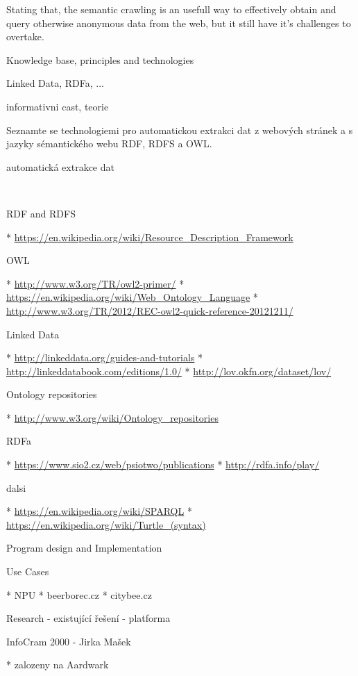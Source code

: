 Stating that, the semantic crawling is an usefull way to effectively obtain and
query otherwise anonymous data from the web, but it still have it's challenges
to overtake. 


\chap Knowledge base, principles and technologies

 Linked Data, RDFa, ...

informativni cast, teorie

Seznamte se technologiemi pro automatickou extrakci dat z webových stránek a s
jazyky sémantického webu RDF, RDFS a OWL.

\sec automatická extrakce dat

~

\sec RDF and RDFS

\begitems
 * \url{https://en.wikipedia.org/wiki/Resource_Description_Framework}
\enditems


\sec OWL

\begitems
 * \url{http://www.w3.org/TR/owl2-primer/}
 * \url{https://en.wikipedia.org/wiki/Web_Ontology_Language}
 * \url{http://www.w3.org/TR/2012/REC-owl2-quick-reference-20121211/}
\enditems


\sec Linked Data

\begitems
 * \url{http://linkeddata.org/guides-and-tutorials}
 * \url{http://linkeddatabook.com/editions/1.0/}
 * \url{http://lov.okfn.org/dataset/lov/}
\enditems


\sec Ontology repositories

\begitems
 * \url{http://www.w3.org/wiki/Ontology_repositories}
\enditems


\sec RDFa

\begitems
 * \url{https://www.sio2.cz/web/psiotwo/publications}
 * \url{http://rdfa.info/play/}
\enditems


\sec dalsi

\begitems
 * \url{https://en.wikipedia.org/wiki/SPARQL}
 * \url{https://en.wikipedia.org/wiki/Turtle_(syntax)}
\enditems






\chap Program design and Implementation


\sec Use Cases

\begitems
  * NPU
  * beerborec.cz
  * citybee.cz
\enditems



\sec Research - existující řešení - platforma


\secc InfoCram 2000 - Jirka Mašek

\begitems
  * zalozeny na Aardwark 
\enditems


